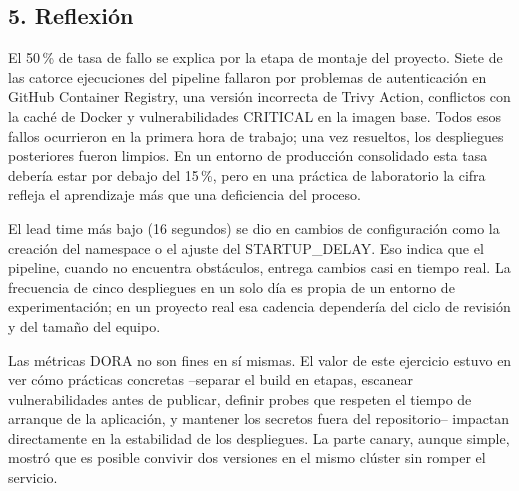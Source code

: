 \documentclass[12pt,a4paper]{article}
\begin{document}
\subsection*{5. Reflexi\'on}

El 50\,\% de tasa de fallo se explica por la etapa de montaje del proyecto. Siete de las catorce ejecuciones del pipeline fallaron por problemas de autenticaci\'on en GitHub Container Registry, una versi\'on incorrecta de Trivy Action, conflictos con la cach\'e de Docker y vulnerabilidades CRITICAL en la imagen base. Todos esos fallos ocurrieron en la primera hora de trabajo; una vez resueltos, los despliegues posteriores fueron limpios. En un entorno de producci\'on consolidado esta tasa deber\'ia estar por debajo del 15\,\%, pero en una pr\'actica de laboratorio la cifra refleja el aprendizaje m\'as que una deficiencia del proceso.

El lead time m\'as bajo (16 segundos) se dio en cambios de configuraci\'on como la creaci\'on del namespace o el ajuste del STARTUP\_DELAY. Eso indica que el pipeline, cuando no encuentra obst\'aculos, entrega cambios casi en tiempo real. La frecuencia de cinco despliegues en un solo d\'ia es propia de un entorno de experimentaci\'on; en un proyecto real esa cadencia depender\'ia del ciclo de revisi\'on y del tama\~no del equipo.

Las m\'etricas DORA no son fines en s\'i mismas. El valor de este ejercicio estuvo en ver c\'omo pr\'acticas concretas --separar el build en etapas, escanear vulnerabilidades antes de publicar, definir probes que respeten el tiempo de arranque de la aplicaci\'on, y mantener los secretos fuera del repositorio-- impactan directamente en la estabilidad de los despliegues. La parte canary, aunque simple, mostr\'o que es posible convivir dos versiones en el mismo cl\'uster sin romper el servicio.
\end{document}
